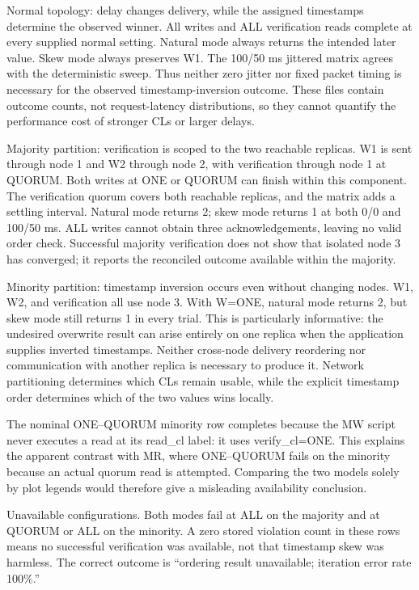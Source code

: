 Normal topology: delay changes delivery, while the assigned timestamps determine the observed winner. All writes and ALL verification reads complete at every supplied normal setting. Natural mode always returns the intended later value. Skew mode always preserves W1. The 100/50 ms jittered matrix agrees with the deterministic sweep. Thus neither zero jitter nor fixed packet timing is necessary for the observed timestamp-inversion outcome. These files contain outcome counts, not request-latency distributions, so they cannot quantify the performance cost of stronger CLs or larger delays.

Majority partition: verification is scoped to the two reachable replicas. W1 is sent through node 1 and W2 through node 2, with verification through node 1 at QUORUM. Both writes at ONE or QUORUM can finish within this component. The verification quorum covers both reachable replicas, and the matrix adds a settling interval. Natural mode returns 2; skew mode returns 1 at both 0/0 and 100/50 ms. ALL writes cannot obtain three acknowledgements, leaving no valid order check. Successful majority verification does not show that isolated node 3 has converged; it reports the reconciled outcome available within the majority.

Minority partition: timestamp inversion occurs even without changing nodes. W1, W2, and verification all use node 3. With W=ONE, natural mode returns 2, but skew mode still returns 1 in every trial. This is particularly informative: the undesired overwrite result can arise entirely on one replica when the application supplies inverted timestamps. Neither cross-node delivery reordering nor communication with another replica is necessary to produce it. Network partitioning determines which CLs remain usable, while the explicit timestamp order determines which of the two values wins locally.

The nominal ONE--QUORUM minority row completes because the MW script never executes a read at its read\_cl label: it uses verify\_cl=ONE. This explains the apparent contrast with MR, where ONE--QUORUM fails on the minority because an actual quorum read is attempted. Comparing the two models solely by plot legends would therefore give a misleading availability conclusion.

Unavailable configurations. Both modes fail at ALL on the majority and at QUORUM or ALL on the minority. A zero stored violation count in these rows means no successful verification was available, not that timestamp skew was harmless. The correct outcome is ``ordering result unavailable; iteration error rate 100\%.''

